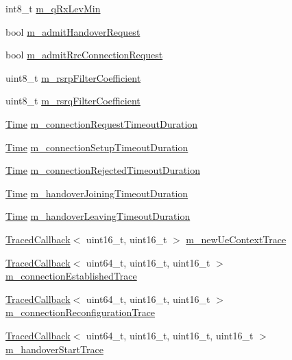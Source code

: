 \begin{DoxyCompactItemize}
int8\+\_\+t \hyperlink{classns3_1_1LteEnbRrc_a17165cd0183013d03b55fead640067d8}{m\+\_\+q\+Rx\+Lev\+Min}
\item 
bool \hyperlink{classns3_1_1LteEnbRrc_a727e2ef6a1438fce36c1d6236180364b}{m\+\_\+admit\+Handover\+Request}
\item 
bool \hyperlink{classns3_1_1LteEnbRrc_abe8ea555ca7235035d4fd13b35d12bd5}{m\+\_\+admit\+Rrc\+Connection\+Request}
\item 
uint8\+\_\+t \hyperlink{classns3_1_1LteEnbRrc_ab5d107b13d8042f862008b8d440fe3a6}{m\+\_\+rsrp\+Filter\+Coefficient}
\item 
uint8\+\_\+t \hyperlink{classns3_1_1LteEnbRrc_a505a1db46c8f5b6abe174a536485c44d}{m\+\_\+rsrq\+Filter\+Coefficient}
\item 
\hyperlink{classns3_1_1Time}{Time} \hyperlink{classns3_1_1LteEnbRrc_a3dba971d1d2ba0891779c9860b60345b}{m\+\_\+connection\+Request\+Timeout\+Duration}
\item 
\hyperlink{classns3_1_1Time}{Time} \hyperlink{classns3_1_1LteEnbRrc_a6709d1de2b719fa9722b7bdbf0e56176}{m\+\_\+connection\+Setup\+Timeout\+Duration}
\item 
\hyperlink{classns3_1_1Time}{Time} \hyperlink{classns3_1_1LteEnbRrc_a6624cf55251a24138828f010a42ab1ea}{m\+\_\+connection\+Rejected\+Timeout\+Duration}
\item 
\hyperlink{classns3_1_1Time}{Time} \hyperlink{classns3_1_1LteEnbRrc_af6b40249d64556c103459131c70ee474}{m\+\_\+handover\+Joining\+Timeout\+Duration}
\item 
\hyperlink{classns3_1_1Time}{Time} \hyperlink{classns3_1_1LteEnbRrc_acf57f59c97e8e1207d8eea66590fbc27}{m\+\_\+handover\+Leaving\+Timeout\+Duration}
\item 
\hyperlink{classns3_1_1TracedCallback}{Traced\+Callback}$<$ uint16\+\_\+t, uint16\+\_\+t $>$ \hyperlink{classns3_1_1LteEnbRrc_a9df01020b6a3a37842a029c30f2314db}{m\+\_\+new\+Ue\+Context\+Trace}
\item 
\hyperlink{classns3_1_1TracedCallback}{Traced\+Callback}$<$ uint64\+\_\+t, uint16\+\_\+t, uint16\+\_\+t $>$ \hyperlink{classns3_1_1LteEnbRrc_af189365b7174515e14d078971bc56990}{m\+\_\+connection\+Established\+Trace}
\item 
\hyperlink{classns3_1_1TracedCallback}{Traced\+Callback}$<$ uint64\+\_\+t, uint16\+\_\+t, uint16\+\_\+t $>$ \hyperlink{classns3_1_1LteEnbRrc_abd0a3deec4a7123637d9604616e934df}{m\+\_\+connection\+Reconfiguration\+Trace}
\item 
\hyperlink{classns3_1_1TracedCallback}{Traced\+Callback}$<$ uint64\+\_\+t, uint16\+\_\+t, uint16\+\_\+t, uint16\+\_\+t $>$ \hyperlink{classns3_1_1LteEnbRrc_a1823b75aad2734d49d4ba83963bdd6fe}{m\+\_\+handover\+Start\+Trace}

\end{DoxyCompactItemize}
